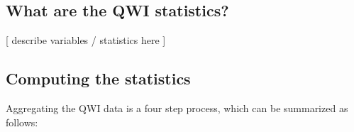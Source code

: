                       
%



\subsection{What are the QWI statistics?}
\label{sec:qwi:what}

[ describe variables / statistics here ]


\subsection{Computing the statistics}
\label{sec:qwi:compute}


Aggregating the QWI data is a four step process, which can be summarized as
follows:


